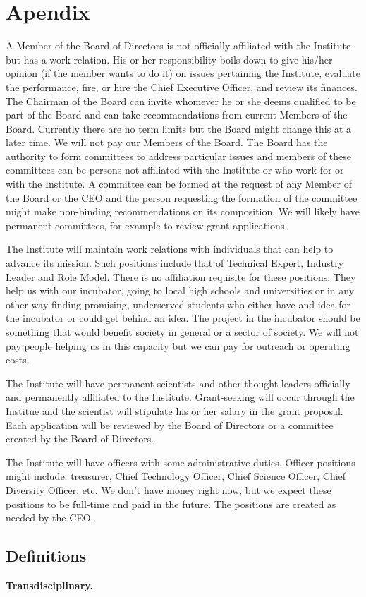 \section{Apendix}

A Member of the Board of Directors is not officially affiliated with the Institute but has a work relation. His or her responsibility boils down to give his/her opinion (if the member wants to do it) on issues pertaining the Institute, evaluate the performance, fire, or hire the Chief Executive Officer, and review its finances. The Chairman of the Board can invite whomever he or she deems qualified to be part of the Board and can take recommendations from current Members of the Board. Currently there are no term limits but the Board might change this at a later time. We will not pay our Members of the Board. The Board has the authority to form committees to address particular issues and members of these committees can be persons not affiliated with the Institute or who work for or with the Institute. A committee can be formed at the request of any Member of the Board or the CEO and the person requesting the formation of the committee might make non-binding recommendations on its composition. We will likely have permanent committees, for example to review grant applications.

The Institute will maintain work relations with individuals that can help to advance its mission. Such positions include that of Technical Expert, Industry Leader and Role Model. There is no affiliation requisite for these positions. They help us with our incubator, going to local high schools and universities or in any other way finding promising, underserved students who either have and idea for the incubator or could get behind an idea. The project in the incubator should be something that would benefit society in general or a sector of society. We will not pay people helping us in this capacity but we can pay for outreach or operating costs.

The Institute will have permanent scientists and other thought leaders officially and permanently affiliated to the Institute. Grant-seeking will occur through the Institue and the scientist will stipulate his or her salary in the grant proposal. Each application will be reviewed by the Board of Directors or a committee created by the Board of Directors.

The Institute will have officers with some administrative duties. Officer positions might include: treasurer, Chief Technology Officer, Chief Science Officer, Chief Diversity Officer, etc. We don't have money right now, but we expect these positions to be full-time and paid in the future. The positions are created as needed by the CEO. 

\subsection{Definitions}

\textbf{Transdisciplinary.} 